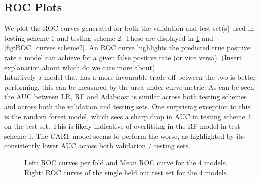 \documentclass[11pt, letterpaper, journal]{IEEEtran}
\begin{document}
\subsection{ROC Plots}
We plot the ROC curves generated for both the validation and test set(s) used in testing scheme 1 and testing scheme 2. These are displayed in \ref{fig:ROC_curves scheme1} and \ref{fig:ROC_curves scheme2}. An ROC curve highlights the predicted true positive rate a model can achieve for a given false positive rate (or vice versa). (Insert explanation about which do we care more about).
\\ 
Intuitively a model that has a more favourable trade off between the two is better performing, this can be measured by the area under curve metric. As can be seen the AUC between LR, RF and Adaboost is similar across both testing schemes and across both the validation and testing sets. One surprising exception to this is the random forest model, which sees a sharp drop in AUC in testing scheme 1 on the test set. This is likely indicative of overfitting in the RF model in test scheme 1. The CART model seems to perform the worse, as highlighted by its consistently lower AUC across both validation / testing sets.

\begin{figure}%
    \centering
    \qquad
    \caption{Left: ROC curves per fold and Mean ROC curve for the 4 models. Right: ROC curves of the single held out test set for the 4 models. }%
    \label{fig:ROC_curves scheme1}%
\end{figure}
\end{document}
